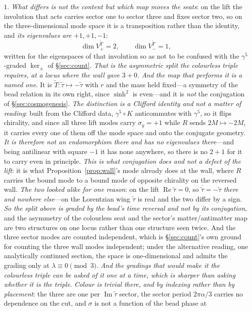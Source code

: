 \documentclass[11pt]{article}
\begin{document}
$1$. \emph{What differs is not the content but which map moves the seats}: on the lift the involution that acts carries sector one to sector three and fixes sector two, so on the three-dimensional mode space it is a transposition rather than the identity, and \emph{its eigenvalues are $+1,+1,-1$}:
\begin{equation}
\dim V^{\widetilde T}_{+}=2,\qquad \dim V^{\widetilde T}_{-}=1 ,
\end{equation}
written for the eigenspaces of that involution so as not to be confused with the $\gamma^{5}$-graded $\ker_{\pm}$ of \S\ref{sec:count}. \emph{That is the asymmetric split the colourless triple requires, at a locus where the wall gave $3{+}0$.} \emph{And the map that performs it is a named one}. It is $\widetilde{T}:\tilde\tau\mapsto-\tilde\tau$ with $r$ and the mass held fixed---a symmetry of the bead relation in its own right, since $\sinh^{2}$ is even---and it is \emph{not} the conjugation of \S\ref{sec:cosmogenesis}. \emph{The distinction is a Clifford identity and not a matter of reading}: built from the Clifford data, $\gamma^{5}\!\circ\!K$ anticommutes with $\gamma^{5}$, so it flips chirality, and since all three lift modes carry $\sigma_y=+1$ while $R$ sends $2M\mapsto-2M$, it carries every one of them off the mode space and onto the conjugate geometry. \emph{It is therefore not an endomorphism there and has no eigenvalues there}---and being antilinear with square $-1$ it has none anywhere, so there is no $2{+}1$ for it to carry even in principle. \emph{This is what conjugation does and not a defect of the lift}: it is what Proposition~\ref{prop:wall}'s mode already does at the wall, where $R$ carries the bound mode to a bound mode of opposite chirality on the reversed wall. \emph{The two looked alike for one reason}: on the lift $\operatorname{Re}\tilde\tau=0$, so $\overline{\tilde\tau}=-\tilde\tau$ \emph{there and nowhere else}---on the Lorentzian wing $\tilde\tau$ is real and the two differ by a sign. \emph{So the split above is graded by the bead's time reversal and not by its conjugation}, and the asymmetry of the colourless seat and the sector's matter/antimatter map are two structures on one locus rather than one structure seen twice. And the three sector modes are counted independent, which is \S\ref{sec:count}'s own ground for counting the three wall modes independent; under the alternative reading, one analytically continued section, the space is one-dimensional and admits the grading only at $\lambda\equiv0\pmod 3$. \emph{And the gradings that would make it the colourless triple can be asked of it one at a time, which is sharper than asking whether it is the triple}. \emph{Colour is trivial there, and by indexing rather than by placement}: the three are one per $\operatorname{Im}\tilde\tau$ sector, the sector period $2\pi\alpha/3$ carries no dependence on the cut, and $\sigma$ is not a function of the bead phase at 
\end{document}
